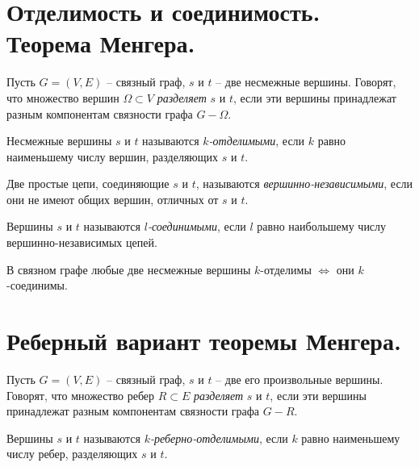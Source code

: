 \section{Отделимость и соединимость. Теорема Менгера.}

\begin{definition}
    Пусть $ G = (V,E) $ -- связный граф, $ s $ и $ t $ -- две несмежные вершины. Говорят, что множество вершин $ \Omega \subset V $ \emph{разделяет} $ s $ и $ t $, если эти вершины принадлежат разным компонентам связности графа $ G - \Omega $.
\end{definition}

\begin{definition}
    Несмежные вершины $ s $ и $ t $ называются \emph{$ k $-отделимыми}, если $ k $ равно наименьшему числу вершин, разделяющих $ s $ и $ t $.
\end{definition}

\begin{definition}
    Две простые цепи, соединяющие $ s $ и $ t $, называются \emph{вершинно-независимыми}, если они не имеют общих вершин, отличных от $ s $ и $ t $.
\end{definition}

\begin{definition}
    Вершины $ s $ и $ t $ называются \emph{$ l $-соединимыми}, если $ l $ равно наибольшему числу вершинно-независимых цепей.
\end{definition}

\begin{theorem}[Менгер]
    В связном графе любые две несмежные вершины $ k $-отделимы $ \iff $ они $ k $-соединимы.
\end{theorem}

\section{Реберный вариант теоремы Менгера.}

\begin{definition}
    Пусть $ G = (V,E) $ -- связный граф, $ s $ и $ t $ -- две его произвольные вершины. Говорят, что множество ребер $ R \subset E $ \emph{разделяет} $ s $ и $ t $, если эти вершины принадлежат разным компонентам связности графа $ G - R $.
\end{definition}

\begin{definition}
    Вершины $ s $ и $ t $ называются \emph{$ k $-реберно-отделимыми}, если $ k $ равно наименьшему числу ребер, разделяющих $ s $ и $ t $.
\end{definition}

